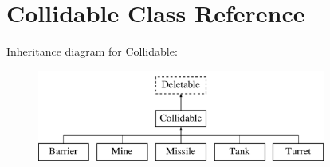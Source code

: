 \hypertarget{class_collidable}{\section{Collidable Class Reference}
\label{class_collidable}
}
Inheritance diagram for Collidable\+:\begin{figure}[H]
\begin{center}
\leavevmode
\includegraphics[height=3.000000cm]{class_collidable}
\end{center}
\end{figure}
